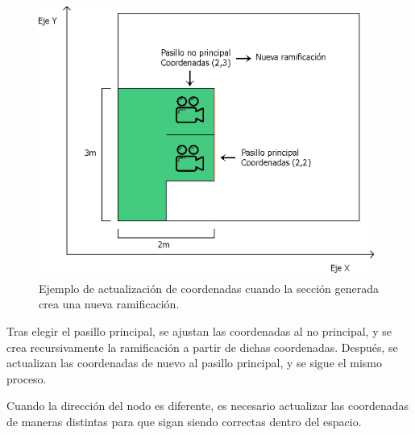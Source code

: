 \documentclass[../main.tex]{subfiles}
\begin{document}
\begin{figure}[h!]
\centering
\includegraphics[width=11cm,height=9cm]{imagenes/Coordinates_Update_Ramification.png}
\caption{Ejemplo de actualización de coordenadas cuando la sección generada crea una nueva ramificación.}
\label{fig:Coordinates_Update_Ramification}
\end{figure}


Tras elegir el pasillo principal, se ajustan las coordenadas al no principal, y se crea recursivamente la ramificación a partir de dichas coordenadas. Después, se actualizan las coordenadas de nuevo al pasillo principal, y se sigue el mismo proceso.

Cuando la dirección del nodo es diferente, es necesario actualizar las coordenadas de maneras distintas para que sigan siendo correctas dentro del espacio.
\end{document}

